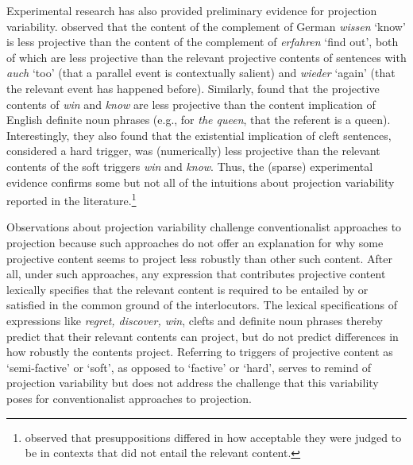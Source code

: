 \documentclass[11pt,fleqn]{article}
\newcommand{\6}{\mbox{$[\hspace*{-.6mm}[$}}
\newcommand{\9}{\mbox{$]\hspace*{-.6mm}]$}}
\begin{document}
Experimental research has also provided preliminary evidence for projection variability. \citet{xue-onea11} observed that the content of the complement of German {\em wissen} `know' is less projective than the content of the complement of {\em erfahren} `find out', both of which are less projective than the relevant projective contents of sentences with {\em auch} `too' (that a parallel event is contextually salient) and {\em wieder} `again' (that the relevant event has happened before). Similarly, \citet{smith-hall11} found that the projective contents of {\em win} and {\em know} are less projective than the content implication of English definite noun phrases (e.g., for {\em the queen}, that the referent is a queen). Interestingly, they also found that the existential implication of cleft sentences, considered a hard trigger, was (numerically) less projective than the relevant contents of the soft triggers {\em win} and {\em know}. Thus, the (sparse) experimental evidence confirms some but not all of the intuitions about projection variability reported in the literature.\footnote{\citealt{tiemann-etal11} observed that presuppositions differed in how acceptable they were judged to be in contexts that did not entail the relevant content.}

Observations about projection variability challenge conventionalist approaches to projection because such approaches do not offer an explanation for why some projective content seems to project less robustly than other such content. After all, under such approaches, any expression that contributes projective content lexically specifies that the relevant content is required to be entailed by or satisfied in the common ground of the interlocutors. The lexical specifications of expressions like {\em regret, discover, win}, clefts and definite noun phrases thereby predict that their relevant contents can project, but do not predict differences in how robustly the contents project. Referring to triggers of projective content as `semi-factive' or `soft', as opposed to `factive' or `hard', serves to remind of projection variability but does not address the challenge that this variability poses for conventionalist approaches to projection.
\end{document}
